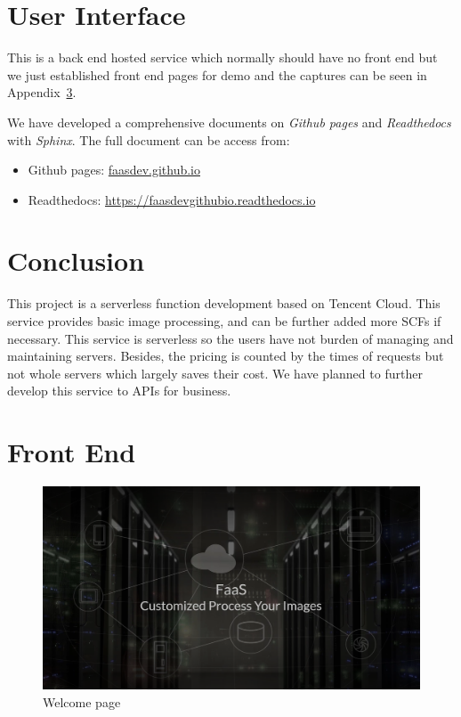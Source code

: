\documentclass[a4paper,12pt]{article}
\begin{document}
\section{User Interface}

This is a back end hosted service which normally should have no front end but we just established front end pages for demo and the captures can be seen in Appendix~\ref{sec:demo}.

We have developed a comprehensive documents on \textit{Github pages} and \textit{Readthedocs} with \textit{Sphinx}. The full document can be access from:
\begin{itemize}
	\item Github pages: \url{faasdev.github.io}
	\item Readthedocs: \url{https://faasdevgithubio.readthedocs.io}
\end{itemize}

\section{Conclusion}
This project is a serverless function development based on Tencent Cloud. This service provides basic image processing, and can be further added more SCFs if necessary. This service is serverless so the users have not burden of managing and maintaining servers. Besides, the pricing is counted by the times of requests but not whole servers which largely saves their cost. We have planned to further develop this service to APIs for business. 

\appendix

\section{Front End}
\label{sec:demo}
\begin{figure}[H]
\centering
\includegraphics[scale=0.3]{figures/demo1.png}
\caption{\label{fig:demo1}Welcome page}
\end{figure}
\end{document}
